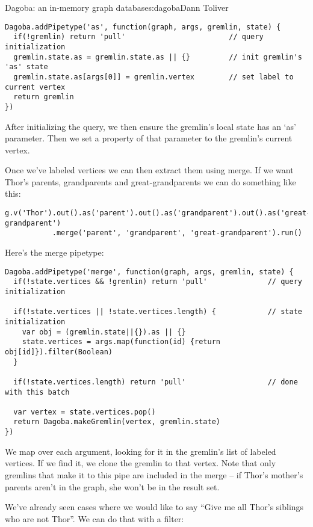 \begin{aosachapter}{Dagoba: an in-memory graph database}{s:dagoba}{Dann Toliver}
\begin{verbatim}
Dagoba.addPipetype('as', function(graph, args, gremlin, state) {
  if(!gremlin) return 'pull'                        // query initialization
  gremlin.state.as = gremlin.state.as || {}         // init gremlin's 'as' state
  gremlin.state.as[args[0]] = gremlin.vertex        // set label to current vertex
  return gremlin
})
\end{verbatim}

After initializing the query, we then ensure the gremlin's local state
has an `as' parameter. Then we set a property of that parameter to the
gremlin's current vertex.

\label{merge}

Once we've labeled vertices we can then extract them using merge. If we
want Thor's parents, grandparents and great-grandparents we can do
something like this:

\begin{verbatim}
g.v('Thor').out().as('parent').out().as('grandparent').out().as('great-grandparent')
           .merge('parent', 'grandparent', 'great-grandparent').run()
\end{verbatim}

Here's the merge pipetype:

\begin{verbatim}
Dagoba.addPipetype('merge', function(graph, args, gremlin, state) {
  if(!state.vertices && !gremlin) return 'pull'              // query initialization

  if(!state.vertices || !state.vertices.length) {            // state initialization
    var obj = (gremlin.state||{}).as || {}
    state.vertices = args.map(function(id) {return obj[id]}).filter(Boolean)
  }

  if(!state.vertices.length) return 'pull'                   // done with this batch

  var vertex = state.vertices.pop()
  return Dagoba.makeGremlin(vertex, gremlin.state)
})
\end{verbatim}

We map over each argument, looking for it in the gremlin's list of
labeled vertices. If we find it, we clone the gremlin to that vertex.
Note that only gremlins that make it to this pipe are included in the
merge -- if Thor's mother's parents aren't in the graph, she won't be in
the result set.

\label{except}

We've already seen cases where we would like to say ``Give me all Thor's
siblings who are not Thor''. We can do that with a filter:


\end{aosachapter}
